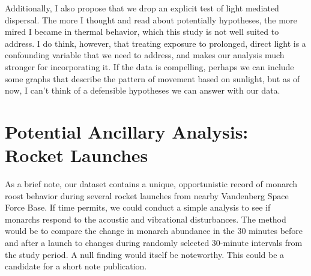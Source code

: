 Additionally, I also propose that we drop an explicit test of light mediated dispersal. The more I thought and read about potentially hypotheses, the more mired I became in thermal behavior, which this study is not well suited to address. I do think, however, that treating exposure to prolonged, direct light is a confounding variable that we need to address, and makes our analysis much stronger for incorporating it. If the data is compelling, perhaps we can include some graphs that describe the pattern of movement based on sunlight, but as of now, I can't think of a defensible hypotheses we can answer with our data. 

\section{Potential Ancillary Analysis: Rocket Launches}

As a brief note, our dataset contains a unique, opportunistic record of monarch roost behavior during several rocket launches from nearby Vandenberg Space Force Base. If time permits, we could conduct a simple analysis to see if monarchs respond to the acoustic and vibrational disturbances. The method would be to compare the change in monarch abundance in the 30 minutes before and after a launch to changes during randomly selected 30-minute intervals from the study period. A null finding would itself be noteworthy. This could be a candidate for a short note publication.
